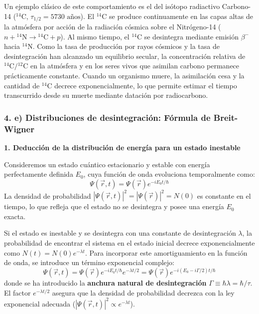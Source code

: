 \begin{ejemplo}
Un ejemplo clásico de este comportamiento es el del isótopo radiactivo Carbono-14 (${}^{14}\text{C}$, $\tau_{1/2} = 5730\text{ años}$). El ${}^{14}\text{C}$ se produce continuamente en las capas altas de la atmósfera por acción de la radiación cósmica sobre el Nitrógeno-14 ($n + {}^{14}\text{N} \to {}^{14}\text{C} + p$). Al mismo tiempo, el ${}^{14}\text{C}$ se desintegra mediante emisión $\beta^-$ hacia ${}^{14}\text{N}$. Como la tasa de producción por rayos cósmicos y la tasa de desintegración han alcanzado un equilibrio secular, la concentración relativa de ${}^{14}\text{C}/{}^{12}\text{C}$ en la atmósfera y en los seres vivos que asimilan carbono permanece prácticamente constante. Cuando un organismo muere, la asimilación cesa y la cantidad de ${}^{14}\text{C}$ decrece exponencialmente, lo que permite estimar el tiempo transcurrido desde su muerte mediante datación por radiocarbono.
\end{ejemplo}

\newpage
\subsubsection*{4. e) Distribuciones de desintegración: Fórmula de Breit-Wigner}

\textbf{1. Deducción de la distribución de energía para un estado inestable}

Consideremos un estado cuántico estacionario y estable con energía perfectamente definida $E_0$, cuya función de onda evoluciona temporalmente como:
\begin{equation}
\Psi(\vec{r}, t) = \Psi(\vec{r}) e^{-i E_0 t / \hbar}
\end{equation}
La densidad de probabilidad $|\Psi(\vec{r}, t)|^2 = |\Psi(\vec{r})|^2 = N(0)$ es constante en el tiempo, lo que refleja que el estado no se desintegra y posee una energía $E_0$ exacta.

Si el estado es inestable y se desintegra con una constante de desintegración $\lambda$, la probabilidad de encontrar el sistema en el estado inicial decrece exponencialmente como $N(t) = N(0) e^{-\lambda t}$. Para incorporar este amortiguamiento en la función de onda, se introduce un término exponencial complejo:
\begin{equation}
\Psi(\vec{r}, t) = \Psi(\vec{r}) e^{-i E_0 t / \hbar} e^{-\lambda t / 2} = \Psi(\vec{r}) e^{-i (E_0 - i \Gamma / 2) t / \hbar}
\end{equation}
donde se ha introducido la \textbf{anchura natural de desintegración} $\Gamma \equiv \hbar \lambda = \hbar / \tau$. El factor $e^{-\lambda t / 2}$ asegura que la densidad de probabilidad decrezca con la ley exponencial adecuada ($|\Psi(\vec{r},t)|^2 \propto e^{-\lambda t}$).

